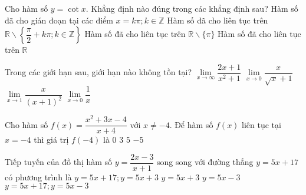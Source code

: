 \begin{ex}%
Cho hàm số $y = \cot x$. Khẳng định nào đúng trong các khẳng định sau?
\choice
{\True Hàm số đã cho gián đoạn tại các điểm $x = k\pi; k \in \mathbb{Z}$}
{Hàm số đã cho liên tục trên $\mathbb{R} \backslash \left\lbrace \dfrac{\pi}{2} + k\pi; k \in \mathbb{Z} \right\rbrace $}
{Hàm số đã cho liên tục trên $\mathbb{R} \backslash \{\pi\}$}
{Hàm số đã cho liên tục trên $\mathbb{R}$}	
\end{ex}

\begin{ex}%
Trong các giới hạn sau, giới hạn nào không tồn tại?
\choice
{$\lim\limits_{x \to \infty} \dfrac{2x + 1}{x^2 + 1}$}
{$\lim\limits_{x \to 0} \dfrac{x}{\sqrt{x} + 1}$}
{$\lim\limits_{x \to 1}\dfrac{x}{(x + 1)^2}$}
{\True $\lim\limits_{x \to 0} \dfrac{1}{x}$}	
\end{ex}

\begin{ex}%
	Cho hàm số $f(x) = \dfrac{x^2 + 3x - 4}{x + 4}$ với $x \neq -4$. Để hàm số $f(x)$ liên tục tại $x = -4$ thì giá trị $f(-4)$ là
	\choice
	{$0$}
	{$3$}
	{$5$}
	{\True $-5$}
\end{ex}

\begin{ex}%
Tiếp tuyến của đồ thị hàm số $y = \dfrac{2x - 3}{x + 1}$ song song với đường thẳng $y = 5x + 17$ có phương trình là
\choice
{$y = 5x + 17; y = 5x + 3$}
{$y = 5x + 3$}
{\True $y = 5x - 3$}
{$y = 5x + 17; y = 5x - 3$}	
\end{ex}

